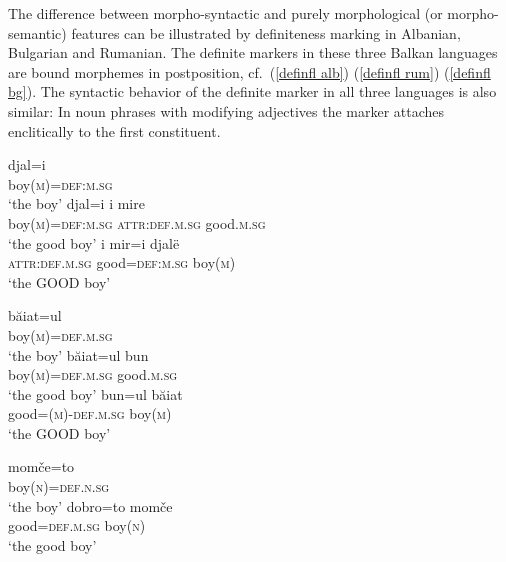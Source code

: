 The difference between morpho-syntactic and purely morphological (or mor\-pho-semantic) features can be illustrated by definiteness marking in Albanian, Bulgarian and Rumanian. The definite markers in these three Balkan languages are bound morphemes in postposition, cf.~(\ref{definfl alb}) (\ref{definfl rum}) (\ref{definfl bg}). The syntactic behavior of the definite marker in all three languages is also similar: In noun phrases with modifying adjectives the marker attaches enclitically to the first constituent. 
\begin{exe}
\begin{xlist}
\ex \label{definfl alb}
\gll	djal=i\\
	boy(\textsc{m})=\textsc{def:m.sg}\\
\glt	‘the boy’
\ex \label{encl alb a}
\gll	djal=i 				i 			mire\\
	boy(\textsc{m})=\textsc{def:m.sg} 	\textsc{attr:def.m.sg}	good.\textsc{m.sg}\\
\glt	‘the good boy’
\ex \label{encl alb b}
\gll	i 			mir=i 			djalë\\
	\textsc{attr:def.m.sg} 	good=\textsc{def:m.sg} 	boy(\textsc{m})\\
\glt	‘the GOOD boy’ 
\end{xlist}
\begin{xlist}
\ex \label{definfl rum}
\gll	băiat=ul\\
	boy(\textsc{m})=\textsc{def.m.sg}\\
\glt	‘the boy’
\ex \label{encl rum a}
\gll	băiat=ul 				bun\\
	boy(\textsc{m})=\textsc{def.m.sg} 	good.\textsc{m.sg}\\
\glt	‘the good boy’
\ex \label{encl rum b}
\gll	bun=ul 					băiat\\
	good=(\textsc{m})-\textsc{def.m.sg} 	boy(\textsc{m})\\
\glt	‘the GOOD boy’
\end{xlist}
\begin{xlist}
\ex \label{definfl bg}
\gll	momče=to\\
	boy(\textsc{n})=\textsc{def.n.sg}\\
\glt	‘the boy’
\ex \label{encl bg}
\gll	dobro=to 		momče\\
	good=\textsc{def.m.sg}	boy(\textsc{n})\\
\glt	‘the good boy’
\end{xlist}	
\end{exe}

